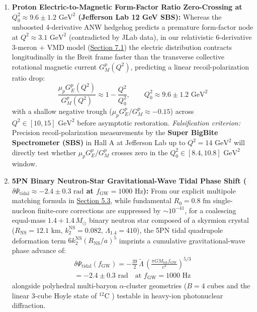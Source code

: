 \documentclass[10pt,aps,prd,twocolumn,superscriptaddress,nofootinbib,floatfix,longbibliography,showkeys]{revtex4-2}
\begin{document}
\begin{enumerate}
  \item \textbf{Proton Electric-to-Magnetic Form-Factor Ratio Zero-Crossing at $Q_0^2 \approx 9.6 \pm 1.2\text{ GeV}^2$ (Jefferson Lab 12 GeV SBS):}
  Whereas the unboosted 4-derivative ANW hedgehog predicts a premature form-factor node at $Q^2 \approx 3.1\text{ GeV}^2$ (contradicted by JLab data), in our relativistic 6-derivative 3-meron + VMD model (\hyperref[sec:7.1]{Section 7.1}) the electric distribution contracts longitudinally in the Breit frame faster than the transverse collective rotational magnetic current $G_M^p(Q^2)$, predicting a linear recoil-polarization ratio drop:
\begin{equation}
\frac{\mu_p G_E^p(Q^2)}{G_M^p(Q^2)} \approx 1 - \frac{Q^2}{Q_0^2}, \qquad Q_0^2 \approx 9.6 \pm 1.2\text{ GeV}^2
\end{equation}
  with a shallow negative trough ($\mu_p G_E^p / G_M^p \approx -0.15$) across $Q^2 \in [10, 15]\text{ GeV}^2$ before asymptotic restoration.
  \textit{Falsification criterion:} Precision recoil-polarization measurements by the \textbf{Super BigBite Spectrometer (SBS)} in Hall A at Jefferson Lab up to $Q^2 = 14\text{ GeV}^2$ will directly test whether $\mu_p G_E^p / G_M^p$ crosses zero in the $Q_0^2 \in [8.4, 10.8]\text{ GeV}^2$ window.

  \item \textbf{5PN Binary Neutron-Star Gravitational-Wave Tidal Phase Shift ($\delta\Psi_{\text{tidal}} \approx -2.4 \pm 0.3\text{ rad}$ at $f_{\text{GW}} = 1000\text{ Hz}$):}
  From our explicit multipole matching formula in \hyperref[sec:5.3]{Section 5.3}, while fundamental $R_0 = 0.8\text{ fm}$ single-nucleon finite-core corrections are suppressed by $\sim 10^{-41}$, for a coalescing equal-mass $1.4 + 1.4\,M_\odot$ binary neutron star composed of a skyrmion crystal ($R_{\text{NS}} = 12.1\text{ km}$, $k_2^{\text{NS}} = 0.082$, $\Lambda_{1.4} = 410$), the 5PN tidal quadrupole deformation term $6 k_2^{\text{NS}}(R_{\text{NS}}/a)^5$ imprints a cumulative gravitational-wave phase advance of:
\begin{multline}
\delta\Psi_{\text{tidal}}(f_{\text{GW}}) = -\frac{39}{2}\,\tilde{\Lambda}\,\left(\frac{\pi G M_{\text{tot}} f_{\text{GW}}}{c^3}\right)^{5/3} \\
= -2.4 \pm 0.3\text{ rad} \quad \text{at } f_{\text{GW}} = 1000\text{ Hz}
\end{multline}
  alongside polyhedral multi-baryon $\alpha$-cluster geometries ($B=4$ cubes and the linear 3-cube Hoyle state of $^{12}\text{C}$ \cite{ref44,ref45,ref46,ref47}) testable in heavy-ion photonuclear diffraction.

\end{enumerate}
\end{document}
